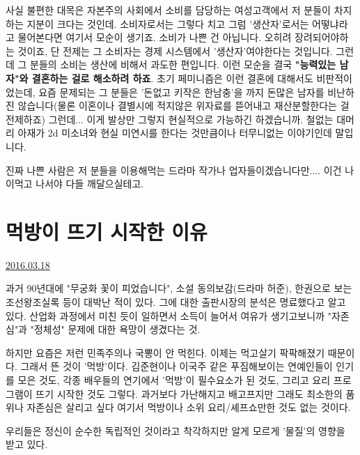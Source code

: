 사실 불편한 대목은 자본주의 사회에서 소비를 담당하는 여성고객에서 저 분들이 차지하는 지분이 크다는 것인데.
소비자로서는 그렇다 치고 그럼 '생산자'로서는 어떻냐라고 물어본다면 여기서 모순이 생기죠.
소비가 나쁜 건 아닙니다. 오히려 장려되어야하는 것이죠, 단 전제는 그 소비자는 경제 시스템에서 '생산자'여야한다는 것입니다.
그런데 그 분들의 소비는 생산에 비해서 과도한 편입니다.
이런 모순을 결국 \textbf{"능력있는 남자"와 결혼하는 걸로 해소하려 하죠}.
초기 페미니즘은 이런 결혼에 대해서도 비판적이었는데, 요즘 문제되는 그 분들은 '돈없고 키작은 한남충'을 까지
돈많은 남자를 비난하진 않습니다(물론 이혼이나 결별시에 적지않은 위자료를 뜯어내고 재산분할한다는 걸 전제하죠)
그런데... 이게 발상만 그렇지 현실적으로 가능하긴 하겠습니까.
철없는 대머리 아재가 2d 미소녀와 현실 미연시를 한다는 것만큼이나 터무니없는 이야기인데 말입니다.
\vspace{5mm}

진짜 나쁜 사람은 저 분들을 이용해먹는 드라마 작가나 업자들이겠습니다만.... 이건 나이먹고 나서야 다들 깨달으실테고.
\vspace{5mm}




\section{먹방이 뜨기 시작한 이유}
\href{https://www.kockoc.com/Apoc/681435}{2016.03.18}

\vspace{5mm}

과거 90년대에
"무궁화 꽃이 피었습니다", 소설 동의보감(드라마 허준), 한권으로 보는 조선왕조실록 등이 대박난 적이 있다.
그에 대한 출판시장의 분석은 명료했다고 알고 있다.
산업화 과정에서 미친 듯이 일하면서 소득이 늘어서 여유가 생기고보니까
"자존심"과 "정체성" 문제에 대한 욕망이 생겼다는 것.
\vspace{5mm}

하지만 요즘은 저런 민족주의나 국뽕이 안 먹힌다.
이제는 먹고살기 팍팍해졌기 때문이다.  그래서 뜬 것이 '먹방'이다.
김준현이나 이국주 같은 푸짐해보이는 연예인들이 인기를 모은 것도,
각종 배우들의 연기에서 '먹방'이 필수요소가 된 것도, 그리고 요리 프로그램이 뜨기 시작한 것도 그렇다.
과거보다 가난해지고 배고프지만 그래도 최소한의 품위나 자존심은 살리고 싶다
여기서 먹방이나 소위 요리/셰프쇼만한 것도 없는 것이다.
\vspace{5mm}

우리들은 정신이 순수한 독립적인 것이라고 착각하지만 알게 모르게 '물질'의 영향을 받고 있다.
\vspace{5mm}

